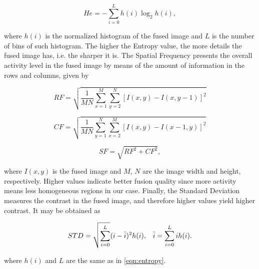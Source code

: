 \begin{equation}
\label{eqn:entropy}
He = - \sum_{i = 0}^{L} h(i) \log_2 h(i),
\end{equation}

\noindent where $h(i)$ is the normalized histogram of the fused image and $L$ is the number of bins of such histogram. The higher the Entropy value, the more details the fused image has, i.e. the sharper it is. The Spatial Frequency presents the overall activity level in the fused image by means of the amount of information in the rows and columns, given by

\begin{equation*}
RF = \sqrt{\frac{1}{M N} 
            \sum_{x = 1}^{M}
            \sum_{y = 2}^{N}
            \left[
                I(x,y) - I(x,y - 1)
            \right]^{2}
}
\end{equation*}

\vspace{0.25cm}

\begin{equation*}
CF = \sqrt{\frac{1}{M N} 
            \sum_{y = 1}^{N}
            \sum_{x = 2}^{M}
            \left[
                I(x,y) - I(x - 1,y)
            \right]^{2}
}
\end{equation*}

\vspace{0.25cm}

\begin{equation}
\label{eqn:spatial_frequency}
SF = \sqrt{RF^{2} + CF^{2}},
\end{equation}

\noindent where $I(x,y)$ is the fused image and $M$, $N$ are the image width and height, respectively. Higher values indicate better fusion quality since more activity means less homogeneous regions in our case. Finally, the Standard Deviation measures the contrast in the fused image, and therefore higher values yield higher contrast. It may be obtained as

\begin{align}
\label{eqn:standard_deviation}
STD = \sqrt{\sum_{i = 0}^{L}}(i - \Bar{i})^{2} h(i),
&&
\Bar{i} = \sum_{i = 0}^{L}i h(i).
\end{align}

\noindent where $h(i)$ and $L$ are the same as in \autoref{eqn:entropy}.